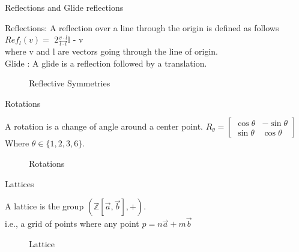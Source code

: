 \documentclass{beamer}
\theoremstyle{definition}
\begin{document}
\begin{frame}{Reflections and Glide reflections}
    \begin{definition}
        Reflections: A reflection over a line through the origin is defined as follows\\
        $Ref_l(v) =$ \(2\frac{v \cdot l}{l \cdot l}\)l - v\\ where v and l are vectors going through the line of origin.\\ 
        Glide : A glide is a reflection followed by a translation.  \cite{Angela:2023}
    \end{definition}
    \begin{figure}
        \centering
        
        \caption{Reflective Symmetries}
        \label{fig:symmetries}
    \end{figure}
\end{frame}

\begin{frame}{Rotations}
    \begin{definition}
        A rotation is a change of angle around a center point.
        $R_\theta = \begin{bmatrix}
            \cos\theta & -\sin\theta\\
            \sin\theta & \cos\theta
        \end{bmatrix}$ 
        Where $\theta \in \{1,2,3,6\}.$ \cite{Angela:2023}
    \end{definition}
    \begin{figure}
        \centering
        
        \caption{Rotations}
        \label{fig:enter-label}
    \end{figure}
\end{frame}

\begin{frame}{Lattices}
    \begin{definition}
        A lattice is the group $(\mathbb{Z}[\Vec{a},\Vec{b}],+).$\\
        i.e., a grid of points where any point $p = n\Vec{a} +m\Vec{b}$ 
    \end{definition}
    \begin{figure}
        \centering
        \scalebox{0.5}{}
        \caption{Lattice}
        \label{fig:enter-label}
    \end{figure}
\end{frame}
\end{document}
